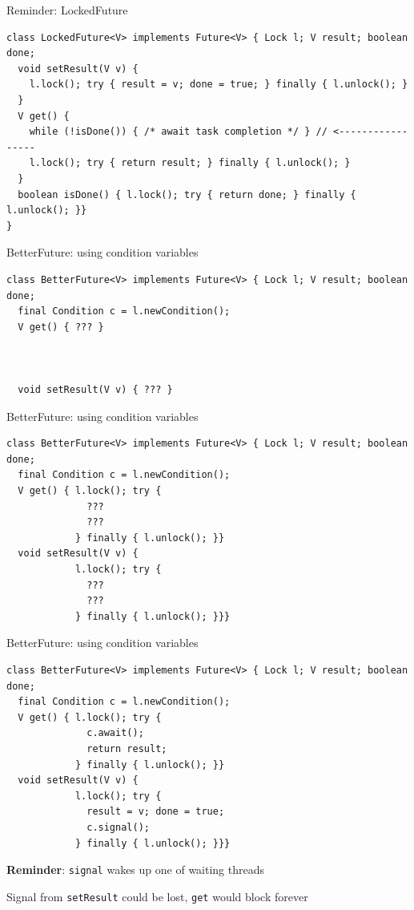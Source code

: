 \begin{frame}{Reminder: LockedFuture}

\begin{verbatim}
class LockedFuture<V> implements Future<V> { Lock l; V result; boolean done;  
  void setResult(V v) { 
    l.lock(); try { result = v; done = true; } finally { l.unlock(); }
  }
  V get() {
    while (!isDone()) { /* await task completion */ } // <-----------------
    l.lock(); try { return result; } finally { l.unlock(); }
  }
  boolean isDone() { l.lock(); try { return done; } finally { l.unlock(); }}
}
\end{verbatim}
\end{frame}

\begin{frame}{BetterFuture: using condition variables}

\begin{verbatim}
class BetterFuture<V> implements Future<V> { Lock l; V result; boolean done;
  final Condition c = l.newCondition();
  V get() { ??? }


  
  void setResult(V v) { ??? }
\end{verbatim}
\end{frame}


\begin{frame}[t,fragile]{BetterFuture: using condition variables}

\begin{verbatim}
class BetterFuture<V> implements Future<V> { Lock l; V result; boolean done;
  final Condition c = l.newCondition();
  V get() { l.lock(); try {
              ???
              ???
            } finally { l.unlock(); }}
  void setResult(V v) { 
            l.lock(); try { 
              ???
              ???
            } finally { l.unlock(); }}}
\end{verbatim}
\end{frame}

\begin{frame}{BetterFuture: using condition variables}

\begin{verbatim}
class BetterFuture<V> implements Future<V> { Lock l; V result; boolean done;
  final Condition c = l.newCondition();
  V get() { l.lock(); try {
              c.await(); 
              return result; 
            } finally { l.unlock(); }}
  void setResult(V v) { 
            l.lock(); try { 
              result = v; done = true;
              c.signal();
            } finally { l.unlock(); }}}
\end{verbatim}

\pause
\textbf{Reminder}: \texttt{signal} wakes up one of waiting threads

\pause
Signal from \texttt{setResult} could be lost, \texttt{get} would block forever
\end{frame}

